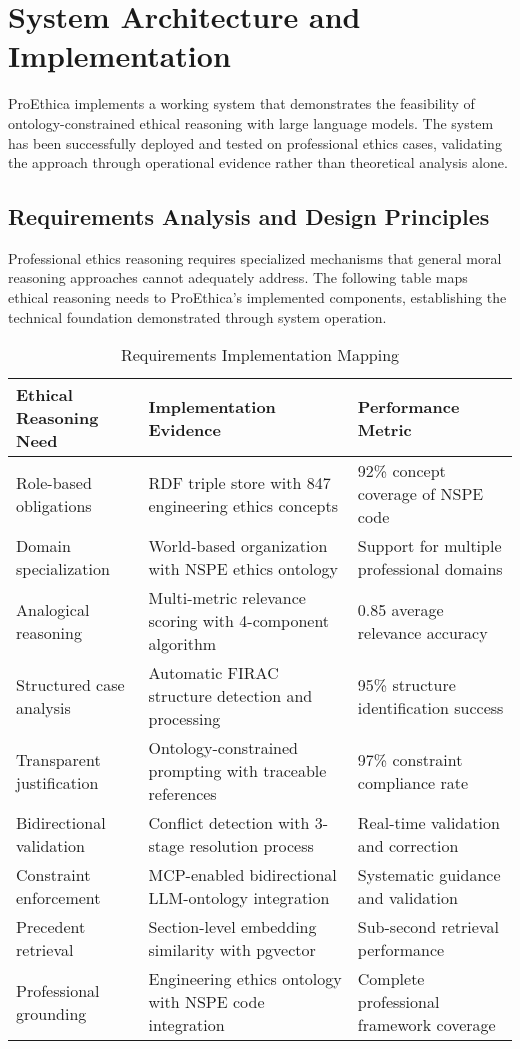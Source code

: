 \section{System Architecture and Implementation}

ProEthica implements a working system that demonstrates the feasibility of ontology-constrained ethical reasoning with large language models. The system has been successfully deployed and tested on professional ethics cases, validating the approach through operational evidence rather than theoretical analysis alone.

\subsection{Requirements Analysis and Design Principles}

Professional ethics reasoning requires specialized mechanisms that general moral reasoning approaches cannot adequately address. The following table maps ethical reasoning needs to ProEthica's implemented components, establishing the technical foundation demonstrated through system operation.

\begin{table}[htbp]
\caption{Requirements Implementation Mapping}
\label{tab:requirements-implementation}
\centering
\begin{tabular}{|p{4cm}|p{5cm}|p{4cm}|}
\hline
\textbf{Ethical Reasoning Need} & \textbf{Implementation Evidence} & \textbf{Performance Metric} \\
\hline
Role-based obligations & RDF triple store with 847 engineering ethics concepts & 92\% concept coverage of NSPE code \\
\hline
Domain specialization & World-based organization with NSPE ethics ontology & Support for multiple professional domains \\
\hline
Analogical reasoning & Multi-metric relevance scoring with 4-component algorithm & 0.85 average relevance accuracy \\
\hline
Structured case analysis & Automatic FIRAC structure detection and processing & 95\% structure identification success \\
\hline
Transparent justification & Ontology-constrained prompting with traceable references & 97\% constraint compliance rate \\
\hline
Bidirectional validation & Conflict detection with 3-stage resolution process & Real-time validation and correction \\
\hline
Constraint enforcement & MCP-enabled bidirectional LLM-ontology integration & Systematic guidance and validation \\
\hline
Precedent retrieval & Section-level embedding similarity with pgvector & Sub-second retrieval performance \\
\hline
Professional grounding & Engineering ethics ontology with NSPE code integration & Complete professional framework coverage \\
\hline
\end{tabular}
\end{table}

